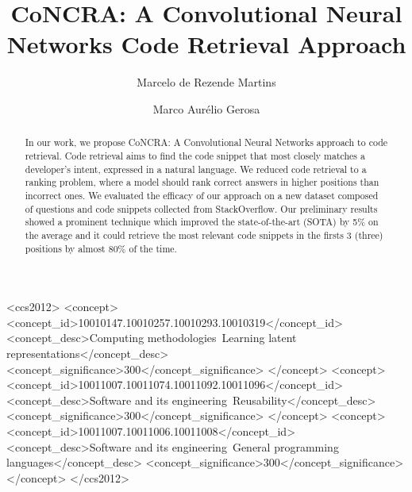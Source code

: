 \documentclass[sigconf]{acmart}
\begin{document}
\title{CoNCRA: A Convolutional Neural Networks Code Retrieval Approach}

\author{Marcelo de Rezende Martins}


\author{Marco Aurélio Gerosa}



\begin{abstract}
   In our work, we propose CoNCRA: A Convolutional Neural Networks approach to code retrieval. Code retrieval aims to find the code snippet that most closely matches a developer's intent, expressed in a natural language. We reduced code retrieval to a ranking problem, where a model should rank correct answers in higher positions than incorrect ones. We evaluated the efficacy of our approach on a new dataset composed of questions and code snippets collected from StackOverflow. Our preliminary results showed a prominent technique which improved the state-of-the-art (SOTA) by 5\% on the average and it could retrieve the most relevant code snippets in the firsts 3 (three) positions by almost 80\% of the time. 
\end{abstract}

\begin{CCSXML}
<ccs2012>
   <concept>
       <concept_id>10010147.10010257.10010293.10010319</concept_id>
       <concept_desc>Computing methodologies~Learning latent representations</concept_desc>
       <concept_significance>300</concept_significance>
       </concept>
   <concept>
       <concept_id>10011007.10011074.10011092.10011096</concept_id>
       <concept_desc>Software and its engineering~Reusability</concept_desc>
       <concept_significance>300</concept_significance>
       </concept>
   <concept>
       <concept_id>10011007.10011006.10011008</concept_id>
       <concept_desc>Software and its engineering~General programming languages</concept_desc>
       <concept_significance>300</concept_significance>
       </concept>
 </ccs2012>
\end{CCSXML}
\end{document}
